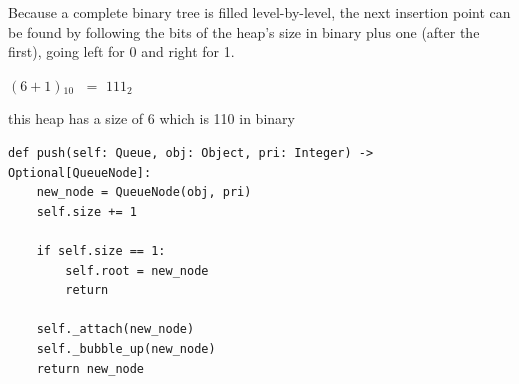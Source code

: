 \documentclass[mathserif, handout]{beamer}
\begin{document}
\begin{frame}
Because a complete binary tree is filled level-by-level, the next insertion point can be found by following the bits of the heap’s size in binary plus one (after the first), going left for 0 and right for 1.
\begin{center}
\Large $(6+1)$\color{lightgray}$_{10}$\color{black} $\;=$ \color{gray}$1$\color{myyellow}$11$\color{lightgray}$_2$
\end{center}

\begin{center}

\end{center}
\begin{center}
    \footnotesize\color{gray} this heap has a size of 6 which is 110 in binary
\end{center}
\end{frame}

\begin{frame}[fragile]
\begin{thmboxtop}
\begin{lstlisting}[style=mypython]
def push(self: Queue, obj: Object, pri: Integer) -> Optional[QueueNode]:
    new_node = QueueNode(obj, pri)
    self.size += 1
    
    if self.size == 1:
        self.root = new_node
        return
        
    self._attach(new_node)
    self._bubble_up(new_node)
    return new_node
\end{lstlisting}
\end{thmboxtop}
\end{frame}
\end{document}
